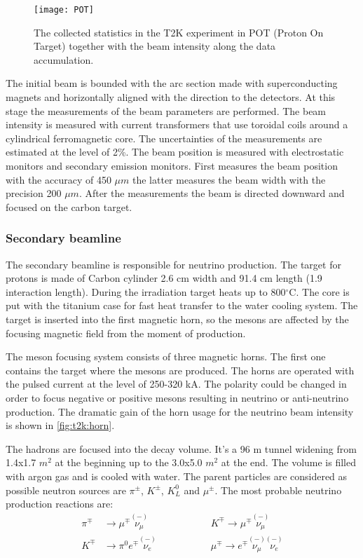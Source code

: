 \documentclass[../main.tex]{subfiles}
\begin{document}
\begin{figure}[!ht]
  \centering
  \texttt{[image: POT]}
  \caption{The collected statistics in the T2K experiment in POT (Proton On Target) together with the beam intensity along the data accumulation.}
  \label{fig:t2k:POT}
\end{figure}

The initial beam is bounded with the arc section made with superconducting magnets and horizontally aligned with the direction to the detectors. At this stage the measurements of the beam parameters are performed. The beam intensity is measured with current transformers that use toroidal coils around a cylindrical ferromagnetic core. The uncertainties of the measurements are estimated at the level of 2\%. The beam position is measured with electrostatic monitors and secondary emission monitors. First measures the beam position with the accuracy of 450 $\mu m$ the latter measures the beam width with the precision 200 $\mu m$. After the measurements the beam is directed downward and focused on the carbon target.

\subsubsection{Secondary beamline}
The secondary beamline is responsible for neutrino production. The target for protons is made of Carbon cylinder 2.6 cm width and 91.4 cm length (1.9 interaction length). During the irradiation target heats up to 800$^\circ$C. The core is put with the titanium case for fast heat transfer to the water cooling system. The target is inserted into the first magnetic horn, so the mesons are affected by the focusing magnetic field from the moment of production.

The meson focusing system consists of three magnetic horns. The first one contains the target where the mesons are produced. The horns are operated with the pulsed current at the level of 250-320 kA. The polarity could be changed in order to focus negative or positive mesons resulting in neutrino or anti-neutrino production. The dramatic gain of the horn usage for the neutrino beam intensity is shown in \autoref{fig:t2k:horn}.

The hadrons are focused into the decay volume. It's a 96 m tunnel widening from 1.4x1.7 $m^2$ at the beginning up to the 3.0x5.0 $m^2$ at the end. The volume is filled with argon gas and is cooled with water. The parent particles are considered as possible neutron sources are $\pi^\pm$, $K^\pm$, $K^0_L$ and $\mu^\pm$. The most probable neutrino production reactions are:
\begin{align}
\pi^\mp&\to\mu^\mp\overset{\scriptscriptstyle(-)}{\nu_\mu} \hspace{2cm} &K^\mp\to\mu^\mp\overset{\scriptscriptstyle(-)}{\nu_\mu} \\
K^\mp&\to\pi^0e^\mp\overset{\scriptscriptstyle(-)}{\nu_e} \hspace{2cm}  &\mu^\mp\to e^\mp\overset{\scriptscriptstyle(-)}{\nu_\mu}\overset{\scriptscriptstyle(-)}{\nu_e}
\end{align}
\end{document}
